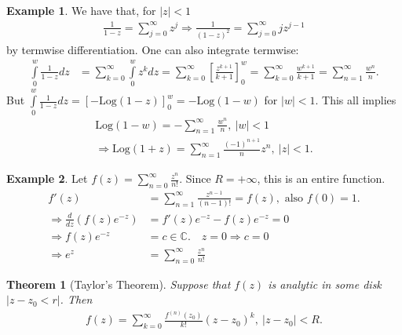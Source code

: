 \documentclass[12pt, a4paper]{article}
\theoremstyle{plain}
\newtheorem{thm}{Theorem} %
\theoremstyle{definition}
\newtheorem{example}{Example} %
\begin{document}
		\begin{example}
			We have that, for $|z|<1$
			\begin{align*}
				\frac{1}{1-z} = 
				\sum\limits_{j=0}^{\infty}z^j
				\Rightarrow \frac{1}{(1-z)^2} = \sum\limits_{j=0}^{\infty}jz^{j-1}
			\end{align*}
			by termwise differentiation. One can also integrate termwise:
			\begin{align*}
				\int\limits_{0}^{w}\frac{1}{1-z}dz &=
				\sum\limits_{k=0}^{\infty}\int\limits_{0}^{w}z^k dz =
				\sum\limits_{k=0}^{\infty}\left[\frac{z^{k+1}}{k+1}\right]_0^w =
				\sum\limits_{k=0}^{\infty}\frac{w^{k+1}}{k+1} =
				\sum\limits_{n=1}^{\infty}\frac{w^{n}}{n}.
			\end{align*}
			But $\displaystyle\int\limits_{0}^{w}\frac{1}{1-z}dz = [- \mathrm{Log}(1-z)]_0^w = - \mathrm{Log}(1-w)$ for $|w|<1$. This all implies
			\begin{align*}
				\mathrm{Log}(1-w) = -\sum\limits_{n=1}^{\infty}\frac{w^{n}}{n},\:|w|<1\\
				\Rightarrow \mathrm{Log}(1+z) = \sum\limits_{n=1}^{\infty}\frac{(-1)^{n+1}}{n}z^n,\:|z|<1.
			\end{align*}
		\end{example}

		\begin{example}
			Let $\displaystyle f(z) = \sum\limits_{n=0}^{\infty}\frac{z^n}{n!}$. Since $R=+\infty$, this is an entire function.
			\begin{align*}
				f'(z) &= \sum\limits_{n=1}^{\infty}\frac{z^{n-1}}{(n-1)!} = 
				f(z),\text{ also } f(0)=1.\\
				\Rightarrow \frac{d}{dz}\left(f(z)e^{-z}\right) &= 
				f'(z)e^{-z}-f(z)e^{-z} = 0\\
				\Rightarrow f(z)e^{-z} &= c\in \mathbb{C}.\quad z=0\Rightarrow c=0\\
				\Rightarrow e^z &= \sum\limits_{n=0}^{\infty}\frac{z^n}{n!}
			\end{align*}
		\end{example}

		\begin{thm}[Taylor's Theorem]
		\label{thm:taylors_theorem}
			Suppose that $f(z)$ is analytic in some disk $|z-z_0<r|$. Then
			\begin{align*}
				f(z)= \sum\limits_{k=0}^{\infty}\frac{f^{(n)}(z_0)}{k!}(z-z_0)^k,\:|z-z_0|<R.
			\end{align*}
		\end{thm}
\end{document}
